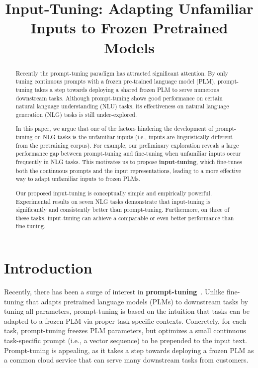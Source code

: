 \title{Input-Tuning: Adapting Unfamiliar Inputs to Frozen Pretrained Models}

\begin{abstract}
Recently the prompt-tuning paradigm has attracted significant attention. By only tuning continuous prompts with a frozen pre-trained language model (PLM), prompt-tuning takes a step towards deploying a shared frozen PLM to serve numerous downstream tasks. Although prompt-tuning shows good performance on certain natural language understanding (NLU) tasks, its effectiveness on natural language generation (NLG) tasks is still under-explored. 

In this paper, we argue that one of the factors hindering the development of prompt-tuning on NLG tasks is the unfamiliar inputs (i.e., inputs are linguistically different from the pretraining corpus). For example, our preliminary exploration reveals a large performance gap between prompt-tuning and fine-tuning when unfamiliar inputs occur frequently in NLG tasks. This motivates us to propose \textbf{input-tuning}, which fine-tunes both the continuous prompts and the input representations, leading to a more effective way to adapt unfamiliar inputs to frozen PLMs.

Our proposed input-tuning is conceptually simple and empirically powerful. Experimental results on seven NLG tasks demonstrate that input-tuning is significantly and consistently better than prompt-tuning. Furthermore, on three of these tasks, input-tuning can achieve a comparable or even better performance than fine-tuning.
\end{abstract}

\section{Introduction}

Recently, there has been a surge of interest in \textbf{prompt-tuning}~\citep{liu2021pre, jiang2020can,shin2020autoprompt,liu2021gpt,lester2021power}. Unlike fine-tuning that adapts pretrained language models (PLMs) to downstream tasks by tuning all parameters, prompt-tuning is based on the intuition that tasks can be adapted to a frozen PLM via proper task-specific contexts. Concretely, for each task, prompt-tuning freezes PLM parameters, but optimizes a small continuous task-specific prompt (i.e., a vector sequence) to be prepended to the input text. Prompt-tuning is appealing, as it takes a step towards deploying a frozen PLM as a common cloud service that can serve many downstream tasks from customers.

